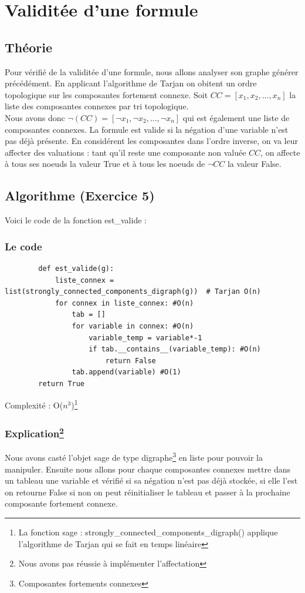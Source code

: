 \documentclass{article}
\begin{document}
    \section{Validitée d'une formule}
    \subsection{Théorie}
    Pour vérifié de la validitée d'une formule, nous allons analyser son graphe générer précédément. En applicant l'algorithme de Tarjan on obitent un ordre topologique sur les composantes fortement connexe. Soit $CC=[x_1,x_2,...,x_n]$ la liste des composantes connexes par tri topologique. \\
    Nous avons donc $\neg{(CC)}=[\neg x_1,\neg x_2,...,\neg x_n]$ qui est également une liste de composantes connexes. La formule est valide si la négation d'une variable n'est pas déjà présente. En considérent les composantes dans l’ordre inverse, on va
    leur affecter des valuations : tant qu’il reste une composante non valuée $CC$, on affecte à tous ses noeuds la valeur True et à tous les noeuds de $\neg CC$ la valeur False. 
    \subsection{Algorithme (Exercice 5)}
    Voici le code de la fonction est\_valide : 
    \subsubsection*{Le code}
    \begin{lstlisting}
        def est_valide(g):
            liste_connex = list(strongly_connected_components_digraph(g))  # Tarjan O(n)
            for connex in liste_connex: #O(n)
                tab = []
                for variable in connex: #O(n)
                    variable_temp = variable*-1
                    if tab.__contains__(variable_temp): #O(n)
                        return False
                tab.append(variable) #O(1)
        return True
    \end{lstlisting} 
    Complexité : O($n^3$)\footnote{La fonction sage : strongly\_connected\_components\_digraph() applique l'algorithme de Tarjan qui se fait en temps linéaire }
    \newpage
    \subsubsection*{Explication\footnote{Nous avons pas réussie à implémenter l'affectation}}
    Nous avons casté l'objet sage de type digraphe\footnote{Composantes fortements connexes} en liste pour pouvoir la manipuler. Ensuite nous allons pour chaque composantes connexes mettre dans un tableau une variable et vérifié si sa négation n'est pas déjà stockée, si elle l'est on retourne False si non on peut réinitialiser le tableau et passer à la prochaine composante fortement connexe. 
\end{document}
